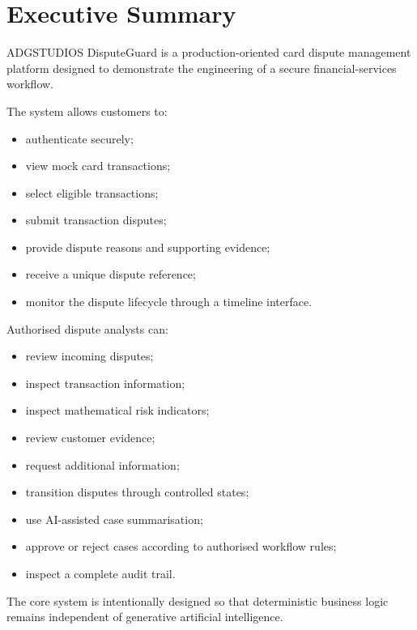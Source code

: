 \documentclass[11pt,a4paper]{article}
\begin{document}
\tableofcontents
\newpage

\section{Executive Summary}

ADGSTUDIOS DisputeGuard is a production-oriented card dispute
management platform designed to demonstrate the engineering of a
secure financial-services workflow.

The system allows customers to:

\begin{itemize}
    \item authenticate securely;
    \item view mock card transactions;
    \item select eligible transactions;
    \item submit transaction disputes;
    \item provide dispute reasons and supporting evidence;
    \item receive a unique dispute reference;
    \item monitor the dispute lifecycle through a timeline interface.
\end{itemize}

Authorised dispute analysts can:

\begin{itemize}
    \item review incoming disputes;
    \item inspect transaction information;
    \item inspect mathematical risk indicators;
    \item review customer evidence;
    \item request additional information;
    \item transition disputes through controlled states;
    \item use AI-assisted case summarisation;
    \item approve or reject cases according to authorised workflow rules;
    \item inspect a complete audit trail.
\end{itemize}

The core system is intentionally designed so that deterministic business
logic remains independent of generative artificial intelligence.
\end{document}
